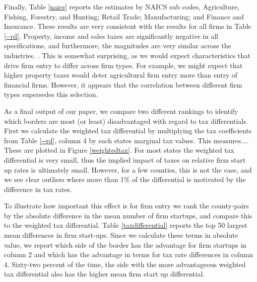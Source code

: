 Finally, Table \ref{naics} reports the estimates by NAICS sub codes,  Agriculture, Fishing, Forestry, and Hunting; Retail Trade; Manufacturing; and Finance and Insurance. These results are very consistent with the results for all firms in Table \ref{--rd}. Property, income and sales taxes are significantly negative in all specifications, and furthermore, the magnitudes are very similar across the industries. . This is somewhat surprising, as we would expect characteristics that drive firm entry to differ across firm types. For example, we might expect that higher property taxes would deter agricultural firm entry more than entry of financial firms.  However, it appears that the correlation between different firm types supersedes this selection. 

As a final output of our paper, we compare two different rankings to identify which borders are most (or least) disadvantaged with regard to tax differentials. First we calculate the weighted tax differential by multiplying the tax coefficients from Table \ref{--rd}, column 4 by each states marginal tax values. This measures....  These are plotted in Figure \ref{weightedtax}. For most states the weighted tax differential is very small, thus the implied impact of taxes on relative firm start up rates is ultimately small. However, for a few counties, this is not the case, and we see clear outliers where more than 1\% of the differential is motivated by the difference in tax rates. 

To illustrate how important this effect is for firm entry we rank the county-pairs by the absolute difference in the mean number of firm startups, and compare this to the weighted tax differential. Table \ref{taxdifferential} reports the top 50 largest mean differences in firm start-ups.  Since we calculate these terms in absolute value, we report which side of the border has  the advantage for firm startups in column 2 and which has the advantage in terms for tax rate differences in column 4.  Sixty-two percent of the time, the side with the more advantageous weighted tax differential also has the higher mean firm start up differential.